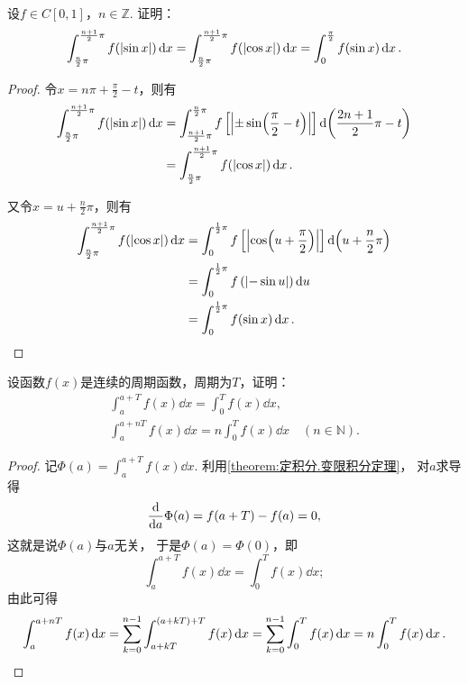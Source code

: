 \begin{example}
设\(f \in C[0,1]\)，\(n\in\mathbb{Z}\).
证明：\begin{equation}
	\int_{\frac{n}{2} \pi}^{\frac{n+1}{2} \pi} f(\abs{\sin x}) \dd{x}
	= \int_{\frac{n}{2} \pi}^{\frac{n+1}{2} \pi} f(\abs{\cos x}) \dd{x}
	= \int_0^{\frac{\pi}{2}} f(\sin x) \dd{x}.
\end{equation}
\def\arraystretch{1.5}
\begin{proof}
令\(x = n\pi+\frac{\pi}{2}-t\)，则有\[
\begin{split}
\int_{\frac{n}{2} \pi}^{\frac{n+1}{2} \pi} f(\abs{\sin x}) \dd{x}
&= \int_{\frac{n+1}{2} \pi}^{\frac{n}{2} \pi} f\left[\abs{\pm\sin(\frac{\pi}{2}-t)}\right] \dd(\frac{2n+1}{2}\pi-t) \\
&= \int_{\frac{n}{2} \pi}^{\frac{n+1}{2} \pi} f(\abs{\cos x}) \dd{x}.
\end{split}
\]

又令\(x=u+\frac{n}{2} \pi\)，则有\[
\begin{split}
\int_{\frac{n}{2} \pi}^{\frac{n+1}{2} \pi} f(\abs{\cos x}) \dd{x}
&= \int_0^{\frac{1}{2}\pi} f\left[ \abs{\cos(u+\frac{\pi}{2})} \right] \dd(u+\frac{n}{2}\pi) \\
&= \int_0^{\frac{1}{2}\pi} f\left( \abs{-\sin u} \right) \dd{u} \\
&= \int_0^{\frac{1}{2}\pi} f(\sin x) \dd{x}.
\qedhere
\end{split}
\]
\end{proof}
\end{example}

\begin{example}
设函数\(f(x)\)是连续的周期函数，周期为\(T\)，证明：
\begin{gather}
	\int_a^{a+T} f(x) \dd{x} = \int_0^T f(x) \dd{x}, \\
	\int_a^{a+nT} f(x) \dd{x} = n\int_0^T f(x) \dd{x}
	\quad(n \in \mathbb{N}).
\end{gather}
\begin{proof}
记\(\Phi(a) = \int_a^{a+T} f(x) \dd{x}\).
利用\cref{theorem:定积分.变限积分定理}，
对\(a\)求导得\[
	\dv{a} \Phi(a) = f(a+T) - f(a) = 0,
\]
这就是说\(\Phi(a)\)与\(a\)无关，
于是\(\Phi(a) = \Phi(0)\)，即\[
	\int_a^{a+T} f(x) \dd{x} = \int_0^T f(x) \dd{x};
\]
由此可得\[
	\int_a^{a+nT} f(x) \dd{x}
	= \sum_{k=0}^{n-1} \int_{a+kT}^{(a+kT)+T} f(x) \dd{x}
	= \sum_{k=0}^{n-1} \int_0^T f(x) \dd{x}
	= n \int_0^T f(x) \dd{x}.
	\qedhere
\]
\end{proof}
\end{example}

